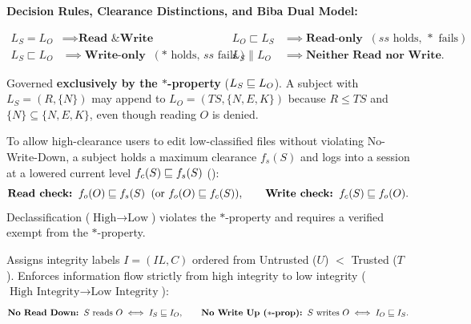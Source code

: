 \textbf{Decision Rules, Clearance Distinctions, and Biba Dual Model:}
\begin{compactitem}
  \item {}
  \begin{align*}
    L_S = L_O &\implies \textbf{Read \& Write} &
    L_O \sqsubset L_S &\implies \textbf{Read-only} \;\; (ss\text{ holds, } *\text{ fails}) \\
    L_S \sqsubset L_O &\implies \textbf{Write-only} \;\; (*\text{ holds, } ss\text{ fails}) &
    L_S \parallel L_O &\implies \textbf{Neither Read nor Write}.
  \end{align*}
  \item {} Governed \textbf{exclusively by the $*$-property} ($L_S \sqsubseteq L_O$). A subject with $L_S = (R, \{N\})$ may append to $L_O = (TS, \{N, E, K\})$ because $R \le TS$ and $\{N\} \subseteq \{N, E, K\}$, even though reading $O$ is denied.
  \item {} To allow high-clearance users to edit low-classified files without violating No-Write-Down, a subject holds a maximum clearance $f_s(S)$ and logs into a session at a lowered current level $f_c(S) \sqsubseteq f_s(S)$ ():
  \[
    \textbf{Read check:} \;\; f_o(O) \sqsubseteq f_s(S) \;\; (\text{or } f_o(O) \sqsubseteq f_c(S)), \qquad
    \textbf{Write check:} \;\; f_c(S) \sqsubseteq f_o(O).
  \]
  Declassification ($\text{High} \to \text{Low}$) violates the $*$-property and requires a verified  exempt from the $*$-property.
  \item {} Assigns integrity labels $I = (IL, C)$ ordered from Untrusted ($U$) $<$ Trusted ($T$). Enforces information flow strictly from high integrity to low integrity ($\text{High Integrity} \to \text{Low Integrity}$):
  \[
    \textbf{No Read Down:} \;\; S \text{ reads } O \iff I_S \sqsubseteq I_O, \qquad
    \textbf{No Write Up ($*$-prop):} \;\; S \text{ writes } O \iff I_O \sqsubseteq I_S.
  \]
\end{compactitem}

